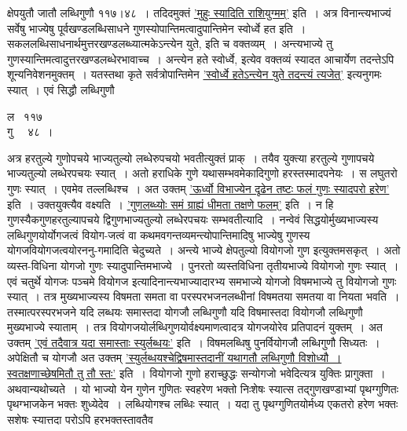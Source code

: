 \documentclass[11pt, openany]{book}
\begin{document}
\newpage

\begin{sloppypar}
\noindent क्षेपयुतौ जातौ लब्धिगुणौ ११७।४८~। तदिदमुक्तं \hyperref[5.51]{'मुहुः स्यादिति राशियुग्मम्'} इति~। अत्र विनान्त्यभाज्यं सर्वेषु भाज्येषु पूर्वखण्डलब्धिसाधने गुणस्योपान्तिमत्वादुपान्तिमेन स्वोर्ध्वे हत इति~। सकललब्धिसाधनार्थमुत्तरखण्डलब्ध्यात्मकेऽन्त्येन युते, इति च वक्तव्यम्~। अन्त्यभाज्ये तु गुणस्यान्तिमत्वादुत्तरखण्डलब्धेरभावाच्च~। अन्त्येन हते स्वोर्ध्वे, इत्येव वक्तव्यं स्यादत आचार्येण तदन्तेऽपि शून्यनिवेशनमुक्तम्~। यतस्तथा कृते सर्वत्रोपान्तिमेन \hyperref[5.51]{'स्वोर्ध्वे हतेऽन्त्येन युते तदन्त्यं त्यजेत्'} इत्यनुगमः स्यात्~। एवं सिद्धौ लब्धिगुणौ
\vspace{-1mm}

\begin{center}
ल ~११७~~ \\
गु ~~४८~।
\end{center}
\vspace{-1mm}

\noindent अत्र हरतुल्ये गुणोपचये भाज्यतुल्यो लब्धेरुपचयो भवतीत्युक्तं प्राक्~। तयैव युक्त्या हरतुल्ये गुणापचये भाज्यतुल्यो लब्धेरपचयः स्यात्~। अतो हराधिके गुणे यथासम्भवमेकादिगुणो हरस्तस्मादपनेयः~। स लघुतरो गुणः स्यात्~। एवमेव तल्लब्धिश्च~। अत उक्तम् \hyperref[5.51]{'ऊर्ध्वो विभाज्येन दृढेन तष्टः फलं गुणः स्यादपरो हरेण'} इति~। उक्तयुक्त्यैव वक्ष्यति~। \hyperref[5.55]{'गुणलब्ध्योः समं ग्राह्यं धीमता तक्षणे फलम्'} इति~। न हि गुणस्यैकगुणहरतुल्यापचये द्विगुणभाज्यतुल्यो लब्धेरपचयः सम्भवतीत्यादि~। नन्वेवं सिद्धयोर्मुख्यभाज्यस्य लब्धिगुणयोर्योगजत्वं वियोग-जत्वं वा कथमवगन्तव्यमन्त्योपान्तिमादिषु भाज्येषु गुणस्य योगजवियोगजत्वयोरननु-गमादिति चेदुच्यते~। अन्त्ये भाज्ये क्षेपतुल्यो वियोगजो गुण इत्युक्तमसकृत्~। अतो व्यस्त-विधिना योगजो गुणः स्यादुपान्तिमभाज्ये~। पुनरतो व्यस्तविधिना तृतीयभाज्ये वियोगजो गुणः स्यात्~। एवं चतुर्थे योगजः पञ्चमे वियोगज इत्यादिनान्त्यभाज्यादारभ्य समभाज्ये योगजो विषमभाज्ये तु वियोगजो गुणः स्यात्~। तत्र मुख्यभाज्यस्य विषमता समता वा परस्परभजनलब्धीनां विषमतया समतया वा नियता भवति~। तस्मात्परस्परभजने यदि लब्धयः समास्तदा योगजौ लब्धिगुणौ यदि विषमास्तदा वियोगजौ लब्धिगुणौ मुख्यभाज्ये स्याताम्~। तत्र वियोगजयोर्लब्धिगुणयोर्वक्ष्यमाणत्वादत्र योगजयोरेव प्रतिपादनं युक्तम्~। अत उक्तम् \hyperref[5.52]{'एवं तदैवात्र यदा समास्ताः स्युर्लब्धयः'} इति~। विषमलब्धिषु पुनर्वियोगजौ लब्धिगुणौ सिध्यतः~। अपेक्षितौ च योगजौ अत उक्तम् \hyperref[5.52]{'स्युर्लब्धयश्चेद्विषमास्तदानीं यथागतौ लब्धिगुणौ विशोध्यौ~। स्वतक्षणाच्छेषमितौ तु तौ स्तः'} इति~। वियोगजो गुणो हराच्छुद्धः सन्योगजो भवेदित्यत्र युक्तिः प्रागुक्ता~। अथवान्यथोच्यते~। यो भाज्यो येन गुणेन गुणितः स्वहरेण भक्तो निःशेषः स्यात्स तद्गुणखण्डाभ्यां पृथग्गुणितः पृथग्भाजकेन भक्तः शुध्येदेव~। लब्धियोगश्च लब्धिः स्यात्~। यदा तु पृथग्गुणितयोर्मध्य एकतरो हरेण भक्तः सशेषः स्यात्तदा परोऽपि हरभक्तस्तावतैव
\end{sloppypar}
\end{document}
